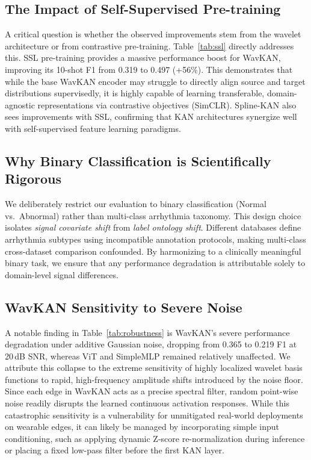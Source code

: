 \documentclass[journal,twoside,web]{ieeecolor}
\begin{document}
\subsection{The Impact of Self-Supervised Pre-training}
A critical question is whether the observed improvements stem from the wavelet architecture or from contrastive pre-training. Table~\ref{tab:ssl} directly addresses this. SSL pre-training provides a massive performance boost for WavKAN, improving its 10-shot F1 from 0.319 to 0.497 (+56\%). This demonstrates that while the base WavKAN encoder may struggle to directly align source and target distributions supervisedly, it is highly capable of learning transferable, domain-agnostic representations via contrastive objectives (SimCLR). Spline-KAN also sees improvements with SSL, confirming that KAN architectures synergize well with self-supervised feature learning paradigms.

\subsection{Why Binary Classification is Scientifically Rigorous}
We deliberately restrict our evaluation to binary classification (Normal vs.\ Abnormal) rather than multi-class arrhythmia taxonomy. This design choice isolates \textit{signal covariate shift} from \textit{label ontology shift}. Different databases define arrhythmia subtypes using incompatible annotation protocols, making multi-class cross-dataset comparison confounded. By harmonizing to a clinically meaningful binary task, we ensure that any performance degradation is attributable solely to domain-level signal differences.

\subsection{WavKAN Sensitivity to Severe Noise}
A notable finding in Table~\ref{tab:robustness} is WavKAN's severe performance degradation under additive Gaussian noise, dropping from 0.365 to 0.219 F1 at 20\,dB SNR, whereas ViT and SimpleMLP remained relatively unaffected. We attribute this collapse to the extreme sensitivity of highly localized wavelet basis functions to rapid, high-frequency amplitude shifts introduced by the noise floor. Since each edge in WavKAN acts as a precise spectral filter, random point-wise noise readily disrupts the learned continuous activation responses. While this catastrophic sensitivity is a vulnerability for unmitigated real-world deployments on wearable edges, it can likely be managed by incorporating simple input conditioning, such as applying dynamic Z-score re-normalization during inference or placing a fixed low-pass filter before the first KAN layer.
\end{document}
